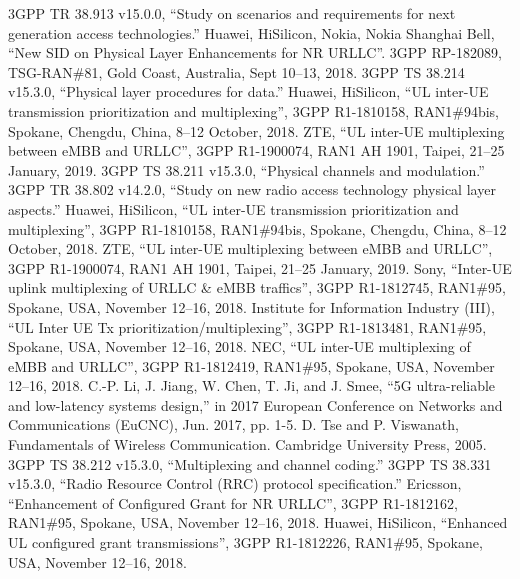 \documentclass{report}
\begin{document}
\clearpage

\begin{thebibliography}{9}
 3GPP TR 38.913 v15.0.0, ``Study on scenarios and requirements for next generation access technologies.''
 Huawei, HiSilicon, Nokia, Nokia Shanghai Bell, ``New SID on Physical Layer Enhancements for NR URLLC''. 3GPP RP-182089, TSG-RAN\#81, Gold Coast, Australia, Sept 10--13, 2018.
 3GPP TS 38.214 v15.3.0, ``Physical layer procedures for data.''
 Huawei, HiSilicon, ``UL inter-UE transmission prioritization and multiplexing'', 3GPP R1-1810158, RAN1\#94bis, Spokane, Chengdu, China, 8--12 October, 2018.
 ZTE, ``UL inter-UE multiplexing between eMBB and URLLC'', 3GPP R1-1900074, RAN1 AH 1901, Taipei,  21--25 January, 2019.
 3GPP TS 38.211 v15.3.0, ``Physical channels and modulation.''
 3GPP TR 38.802 v14.2.0, ``Study on new radio access technology physical layer aspects.''
 Huawei, HiSilicon, ``UL inter-UE transmission prioritization and multiplexing'', 3GPP R1-1810158, RAN1\#94bis, Spokane, Chengdu, China, 8--12 October, 2018.
 ZTE, ``UL inter-UE multiplexing between eMBB and URLLC'', 3GPP R1-1900074, RAN1 AH 1901, Taipei,  21--25 January, 2019.
  Sony, ``Inter-UE uplink multiplexing of URLLC \& eMBB traffics'', 3GPP R1-1812745, RAN1\#95, Spokane, USA, November 12--16, 2018.
  Institute for Information Industry (III), ``UL Inter UE Tx prioritization/multiplexing'', 3GPP R1-1813481, RAN1\#95, Spokane, USA, November 12--16, 2018.
  NEC, ``UL inter-UE multiplexing of eMBB and URLLC'', 3GPP R1-1812419, RAN1\#95, Spokane, USA, November 12--16, 2018.
  C.-P. Li, J. Jiang, W. Chen, T. Ji, and J. Smee, ``5G ultra-reliable and low-latency systems design,'' in 2017 European Conference on Networks and Communications (EuCNC), Jun. 2017, pp. 1-5. 
 D. Tse and P. Viswanath, Fundamentals of Wireless Communication. Cambridge University Press, 2005. 
 3GPP TS 38.212 v15.3.0, ``Multiplexing and channel coding.''
 3GPP TS 38.331 v15.3.0, ``Radio Resource Control (RRC) protocol specification.''
 Ericsson, ``Enhancement of Configured Grant for NR URLLC'', 3GPP R1-1812162, RAN1\#95, Spokane, USA, November 12--16, 2018.
 Huawei, HiSilicon, ``Enhanced UL configured grant transmissions'', 3GPP R1-1812226, RAN1\#95, Spokane, USA, November 12--16, 2018.

\end{thebibliography}
\end{document}
